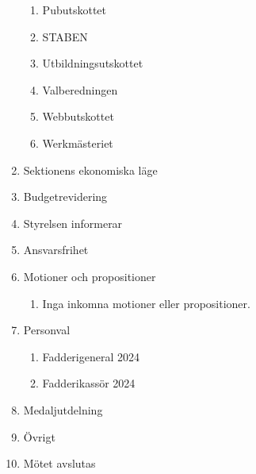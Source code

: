 \documentclass{datateknologsektionen-document}
\begin{document}
\begin{enumerate}[topsep=0pt,itemsep=1ex]
\begin{enumerate}[label*=\arabic*.,leftmargin=3em]
          \item Pubutskottet
          \item STABEN
          \item Utbildningsutskottet
          \item Valberedningen
          \item Webbutskottet
          \item Werkmästeriet
        \end{enumerate}
  \item Sektionens ekonomiska läge
  \item Budgetrevidering
  \item Styrelsen informerar
  \item Ansvarsfrihet
  \item Motioner och propositioner
        \begin{enumerate}[label*=\arabic*.,leftmargin=3em]
          \item Inga inkomna motioner eller propositioner.
        \end{enumerate}
  \item Personval
        \begin{enumerate}[label*=\arabic*.,leftmargin=3em]
          \item Fadderigeneral 2024
          \item Fadderikassör 2024
        \end{enumerate}
  \item Medaljutdelning
  \item Övrigt
  \item Mötet avslutas
\end{enumerate}
\end{document}
